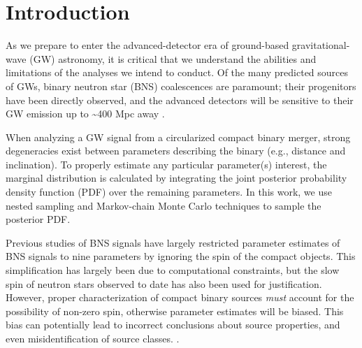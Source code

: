 \section{Introduction}

As we prepare to enter the advanced-detector era of ground-based gravitational-wave (GW) astronomy, it is critical that we understand the abilities and limitations of the analyses we intend to conduct. Of the many predicted sources of GWs, binary neutron star (BNS) coalescences are paramount; their progenitors have been directly observed, and the advanced detectors will be sensitive to their GW emission up to \sim 400 Mpc away \citep{2013arXiv1304.0670L}.

When analyzing a GW signal from a circularized compact binary merger, strong degeneracies exist between parameters describing the binary (e.g., distance and inclination). To properly estimate any particular parameter(s) interest, the marginal distribution is calculated by integrating the joint posterior probability density function (PDF) over the remaining parameters. In this work, we use nested sampling \citep{Veitch_2010} and Markov-chain Monte Carlo \citep{Christensen_2003,R_ver_2006,van_der_Sluys_2008} techniques to sample the posterior PDF.

Previous studies of BNS signals have largely restricted parameter estimates of BNS signals to nine parameters by ignoring the spin of the compact objects. This simplification has largely been due to computational constraints, but the slow spin of neutron stars observed to date \citep[e.g.,][]{Mandel_2010} has also been used for justification. However, proper characterization of compact binary sources \emph{must} account for the possibility of non-zero spin, otherwise parameter estimates will be biased.  This bias can potentially lead to incorrect conclusions about source properties, and even misidentification of source classes. \citep{Buonanno_2009,Berry_2014}.

